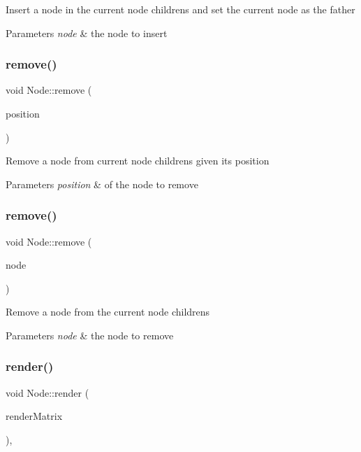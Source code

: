 Insert a node in the current node childrens and set the current node as the father 
\begin{DoxyParams}{Parameters}
{\em node} & the node to insert \\
\hline
\end{DoxyParams}
\mbox{\label{classNode_a25d070363e33ff1e4542d5c203c3c8fa}} 
\subsubsection{\texorpdfstring{remove()}{remove()}\hspace{0.1cm}{\footnotesize\ttfamily [1/2]}}
{\footnotesize\ttfamily void Node\+::remove (\begin{DoxyParamCaption}\item[{int}]{position }\end{DoxyParamCaption})}

Remove a node from current node childrens given its position 
\begin{DoxyParams}{Parameters}
{\em position} & of the node to remove \\
\hline
\end{DoxyParams}
\mbox{\label{classNode_adf26cf6f2c8964d0095cbce8ac849499}} 
\subsubsection{\texorpdfstring{remove()}{remove()}\hspace{0.1cm}{\footnotesize\ttfamily [2/2]}}
{\footnotesize\ttfamily void Node\+::remove (\begin{DoxyParamCaption}\item[{\hyperlink{classNode}{Node} $\ast$}]{node }\end{DoxyParamCaption})}

Remove a node from the current node childrens 
\begin{DoxyParams}{Parameters}
{\em node} & the node to remove \\
\hline
\end{DoxyParams}
\mbox{\label{classNode_a7faebb78a04b6421dbf5afe998f7658d}} 
\subsubsection{\texorpdfstring{render()}{render()}}
{\footnotesize\ttfamily void Node\+::render (\begin{DoxyParamCaption}\item[{glm\+::mat4}]{render\+Matrix }\end{DoxyParamCaption})\hspace{0.3cm}{\ttfamily [override]}, {\ttfamily [virtual]}}

